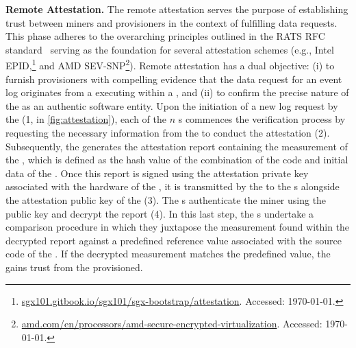 \textbf{Remote Attestation.} The remote attestation serves the purpose of establishing trust between miners and provisioners in the context of fulfilling data requests. This phase adheres to the overarching principles outlined in the RATS RFC standard~\cite{rfc9334} serving as the foundation for several attestation schemes (e.g., Intel EPID,\footnote{\url{sgx101.gitbook.io/sgx101/sgx-bootstrap/attestation}. Accessed: \today.} and AMD SEV-SNP\footnote{\url{amd.com/en/processors/amd-secure-encrypted-virtualization}. Accessed: \today.}). Remote attestation has a dual objective: (i) to furnish provisioners with compelling evidence that the data request for an event log originates from a  executing within a , and (ii) to confirm the precise nature of the  as an authentic  software entity. Upon the initiation of a new log request by the  (1, in \cref{fig:attestation}), each of the $n$ s commences the verification process by requesting the necessary information from the  to conduct the attestation (2). Subsequently, the  generates the attestation report containing the measurement of the , which is defined as the hash value of the combination of the code and initial data of the . Once this report is signed using the attestation private key associated with the hardware of the , it is transmitted by the  to the s alongside the attestation public key of the  (3). The s authenticate the miner using the public key and decrypt the report (4). In this last step, the s undertake a comparison procedure in which they juxtapose the measurement found within the decrypted report against a predefined reference value associated with the source code of the . If the decrypted measurement matches the predefined value, the  gains trust from the provisioned.


